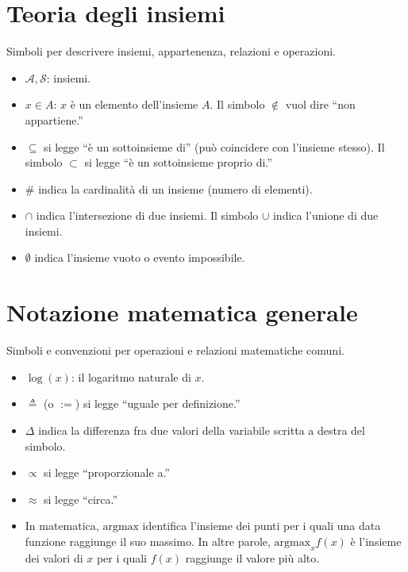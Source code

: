 \documentclass[
  italian,
  letterpaper,
  a4paper,
  11pt,
  open=any]{scrbook}
\providecommand{\tightlist}{%
  \setlength{\itemsep}{0pt}\setlength{\parskip}{0pt}}
\theoremstyle{plain}
\theoremstyle{definition}
\theoremstyle{definition}
\theoremstyle{remark}
\begin{document}
\section{Teoria degli insiemi}\label{teoria-degli-insiemi}

Simboli per descrivere insiemi, appartenenza, relazioni e operazioni.

\begin{itemize}
\tightlist
\item
  \(\mathcal{A, S}\): insiemi.
\item
  \(x \in A\): \(x\) è un elemento dell'insieme \(A\). Il simbolo
  \(\notin\) vuol dire ``non appartiene.''
\item
  \(\subseteq\) si legge ``è un sottoinsieme di'' (può coincidere con
  l'insieme stesso). Il simbolo \(\subset\) si legge ``è un sottoinsieme
  proprio di.''
\item
  \(\#\) indica la cardinalità di un insieme (numero di elementi).
\item
  \(\cap\) indica l'intersezione di due insiemi. Il simbolo \(\cup\)
  indica l'unione di due insiemi.
\item
  \(\emptyset\) indica l'insieme vuoto o evento impossibile.
\end{itemize}

\section{Notazione matematica
generale}\label{notazione-matematica-generale}

Simboli e convenzioni per operazioni e relazioni matematiche comuni.

\begin{itemize}
\tightlist
\item
  \(\log(x)\): il logaritmo naturale di \(x\).
\item
  \(\triangleq\) (o \(:=\)) si legge ``uguale per definizione.''
\item
  \(\Delta\) indica la differenza fra due valori della variabile scritta
  a destra del simbolo.
\item
  \(\propto\) si legge ``proporzionale a.''
\item
  \(\approx\) si legge ``circa.''
\item
  In matematica, \(\mbox{argmax}\) identifica l'insieme dei punti per i
  quali una data funzione raggiunge il suo massimo. In altre parole,
  \(\mbox{argmax}_x f(x)\) è l'insieme dei valori di \(x\) per i quali
  \(f(x)\) raggiunge il valore più alto.
\end{itemize}
\end{document}
